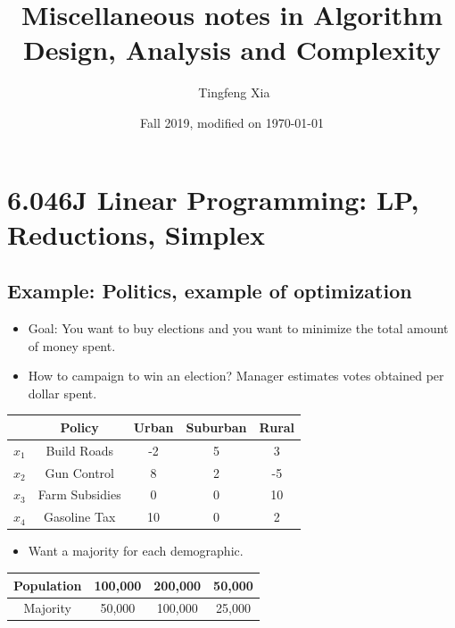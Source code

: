 \documentclass[10pt]{article}
\title{Miscellaneous notes in Algorithm Design, Analysis and Complexity}
\author{\ccLogo \,\,Tingfeng Xia}
\date{Fall 2019, modified on \today}
\begin{document}
\maketitle
\doclicenseThis
\tableofcontents
\newpage

\section{6.046J Linear Programming: LP, Reductions, Simplex}
\subsection{Example: Politics, example of optimization}
\begin{itemize}
    \item Goal: You want to buy elections and you want to minimize the total amount of money spent. 
    \item How to campaign to win an election? Manager estimates votes obtained per dollar spent.
\end{itemize}
\begin{center}
    \begin{tabular}{|c|c||c|c|c|}
        \hline
         & Policy & Urban & Suburban & Rural \\
        \hline
        \hline
        $x_1$ & Build Roads & -2 & 5 & 3 \\
        \hline
        $x_2$ & Gun Control & 8 & 2 & -5 \\
        \hline
        $x_3$ & Farm Subsidies & 0 & 0 & 10 \\
        \hline
        $x_4$ & Gasoline Tax & 10 & 0 & 2 \\
        \hline
    \end{tabular}
\end{center}
\begin{itemize}
    \item Want a majority for each demographic. 
\end{itemize}
\begin{center}
    \begin{tabular}{|c||c|c|c|}
        \hline
        Population & 100,000 & 200,000 & 50,000 \\
        \hline
        Majority & 50,000 & 100,000 & 25,000 \\
        \hline
    \end{tabular}
\end{center}
\end{document}
